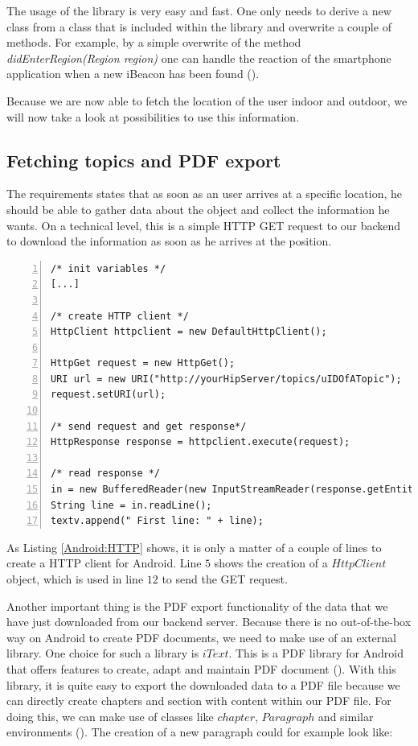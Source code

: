 The usage of the library is very easy and fast. One only needs to derive a new class from a class that is included within the library and overwrite a couple of methods. For example, by a simple overwrite of the method \emph{didEnterRegion(Region region)} one can handle the reaction of the smartphone application when a new iBeacon has been found (\cite{RadiusNetworks:2015ab}).   

Because we are now able to fetch the location of the user indoor and outdoor, we will now take a look at possibilities to use this information.

\subsection{Fetching topics and PDF export}
The requirements states that as soon as an user arrives at a specific location, he should be able to gather data about the object and collect the information he wants. On a technical level, this is a simple \ac{HTTP} GET request to our backend to download the information as soon as he arrives at the position.

\begin{lstlisting}[numbers=left,caption={Creation and usage of an Android \ac{HTTP} client},label=Android:HTTP,frame=tlbr,breaklines]
/* init variables */
[...]

/* create HTTP client */
HttpClient httpclient = new DefaultHttpClient();

HttpGet request = new HttpGet();
URI url = new URI("http://yourHipServer/topics/uIDOfATopic");
request.setURI(url);

/* send request and get response*/
HttpResponse response = httpclient.execute(request);

/* read response */
in = new BufferedReader(new InputStreamReader(response.getEntity().getContent()));
String line = in.readLine();
textv.append(" First line: " + line);
\end{lstlisting}

As Listing \ref{Android:HTTP} shows, it is only a matter of a couple of lines to create a \ac{HTTP} client for Android. Line $5$ shows the creation of a $HttpClient$ object, which is used in line $12$ to send the GET request.

Another important thing is the \ac{PDF} export functionality of the data that we have just downloaded from our backend server.
Because there is no out-of-the-box way on Android to create \ac{PDF} documents, we need to make use of an external library. One choice for such a library is $iText$. This is a \ac{PDF} library for Android that offers features to create, adapt and maintain \ac{PDF} document (\cite{itext2015}).
With this library, it is quite easy to export the downloaded data to a \ac{PDF} file because we can directly create chapters and section with content within our \ac{PDF} file. For doing this, we can make use of classes like $chapter$, $Paragraph$ and similar environments (\cite{pdfCreation}). The creation of a new paragraph could for example look like:

